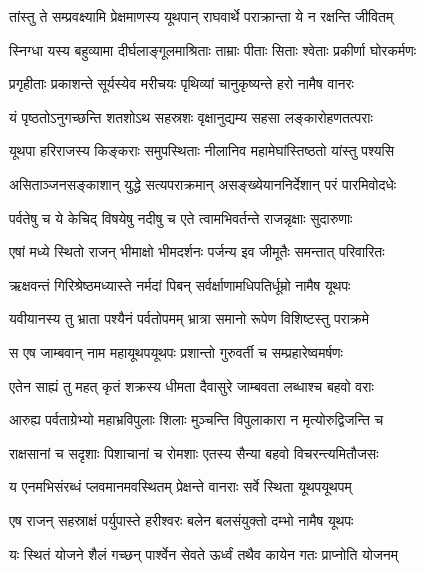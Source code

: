 
\twolineshloka
{तांस्तु ते सम्प्रवक्ष्यामि प्रेक्षमाणस्य यूथपान्}
{राघवार्थे पराक्रान्ता ये न रक्षन्ति जीवितम्} %

\twolineshloka
{स्निग्धा यस्य बहुव्यामा दीर्घलाङ्गूलमाश्रिताः}
{ताम्राः पीताः सिताः श्वेताः प्रकीर्णा घोरकर्मणः} %

\twolineshloka
{प्रगृहीताः प्रकाशन्ते सूर्यस्येव मरीचयः}
{पृथिव्यां चानुकृष्यन्ते हरो नामैष वानरः} %

\twolineshloka
{यं पृष्ठतोऽनुगच्छन्ति शतशोऽथ सहस्रशः}
{वृक्षानुद्यम्य सहसा लङ्कारोहणतत्पराः} %

\twolineshloka
{यूथपा हरिराजस्य किङ्कराः समुपस्थिताः}
{नीलानिव महामेघांस्तिष्ठतो यांस्तु पश्यसि} %

\twolineshloka
{असिताञ्जनसङ्काशान् युद्धे सत्यपराक्रमान्}
{असङ्ख्येयाननिर्देशान् परं पारमिवोदधेः} %

\twolineshloka
{पर्वतेषु च ये केचिद् विषयेषु नदीषु च}
{एते त्वामभिवर्तन्ते राजन्नृक्षाः सुदारुणाः} %

\twolineshloka
{एषां मध्ये स्थितो राजन् भीमाक्षो भीमदर्शनः}
{पर्जन्य इव जीमूतैः समन्तात् परिवारितः} %

\twolineshloka
{ऋक्षवन्तं गिरिश्रेष्ठमध्यास्ते नर्मदां पिबन्}
{सर्वर्क्षाणामधिपतिर्धूम्रो नामैष यूथपः} %

\twolineshloka
{यवीयानस्य तु भ्राता पश्यैनं पर्वतोपमम्}
{भ्रात्रा समानो रूपेण विशिष्टस्तु पराक्रमे} %

\twolineshloka
{स एष जाम्बवान् नाम महायूथपयूथपः}
{प्रशान्तो गुरुवर्ती च सम्प्रहारेष्वमर्षणः} %

\twolineshloka
{एतेन साह्यं तु महत् कृतं शक्रस्य धीमता}
{दैवासुरे जाम्बवता लब्धाश्च बहवो वराः} %

\twolineshloka
{आरुह्य पर्वताग्रेभ्यो महाभ्रविपुलाः शिलाः}
{मुञ्चन्ति विपुलाकारा न मृत्योरुद्विजन्ति च} %

\twolineshloka
{राक्षसानां च सदृशाः पिशाचानां च रोमशाः}
{एतस्य सैन्या बहवो विचरन्त्यमितौजसः} %

\twolineshloka
{य एनमभिसंरब्धं प्लवमानमवस्थितम्}
{प्रेक्षन्ते वानराः सर्वे स्थिता यूथपयूथपम्} %

\twolineshloka
{एष राजन् सहस्राक्षं पर्युपास्ते हरीश्वरः}
{बलेन बलसंयुक्तो दम्भो नामैष यूथपः} %

\twolineshloka
{यः स्थितं योजने शैलं गच्छन् पार्श्वेन सेवते}
{ऊर्ध्वं तथैव कायेन गतः प्राप्नोति योजनम्} %

